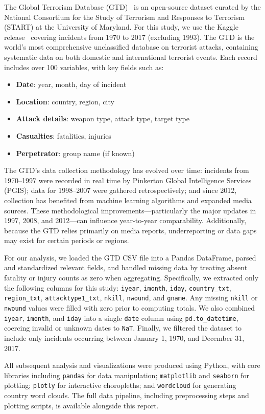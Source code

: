 
The Global Terrorism Database (GTD)~\cite{gtd2018} is an open-source dataset curated by the National Consortium for the Study of Terrorism and Responses to Terrorism (START) at the University of Maryland. For this study, we use the Kaggle release~\cite{kagglegtd} covering incidents from 1970 to 2017 (excluding 1993). The GTD is the world's most comprehensive unclassified database on terrorist attacks, containing systematic data on both domestic and international terrorist events. Each record includes over 100 variables, with key fields such as:
\begin{itemize}
    \item \textbf{Date}: year, month, day of incident
    \item \textbf{Location}: country, region, city
    \item \textbf{Attack details}: weapon type, attack type, target type
    \item \textbf{Casualties}: fatalities, injuries
    \item \textbf{Perpetrator}: group name (if known)
\end{itemize}

The GTD's data collection methodology has evolved over time: incidents from 1970--1997 were recorded in real time by Pinkerton Global Intelligence Services (PGIS); data for 1998--2007 were gathered retrospectively; and since 2012, collection has benefited from machine learning algorithms and expanded media sources. These methodological improvements—particularly the major updates in 1997, 2008, and 2012—can influence year-to-year comparability. Additionally, because the GTD relies primarily on media reports, underreporting or data gaps may exist for certain periods or regions.

For our analysis, we loaded the GTD CSV file into a Pandas DataFrame, parsed and standardized relevant fields, and handled missing data by treating absent fatality or injury counts as zero when aggregating. Specifically, we extracted only the following columns for this study: \texttt{iyear}, \texttt{imonth}, \texttt{iday}, \texttt{country\_txt}, \texttt{region\_txt}, \texttt{attacktype1\_txt}, \texttt{nkill}, \texttt{nwound}, and \texttt{gname}. Any missing \texttt{nkill} or \texttt{nwound} values were filled with zero prior to computing totals. We also combined \texttt{iyear}, \texttt{imonth}, and \texttt{iday} into a single \texttt{date} column using \texttt{pd.to\_datetime}, coercing invalid or unknown dates to \texttt{NaT}. Finally, we filtered the dataset to include only incidents occurring between January 1, 1970, and December 31, 2017.

All subsequent analysis and visualizations were produced using Python, with core libraries including \texttt{pandas} for data manipulation; \texttt{matplotlib} and \texttt{seaborn} for plotting; \texttt{plotly} for interactive choropleths; and \texttt{wordcloud} for generating country word clouds. The full data pipeline, including preprocessing steps and plotting scripts, is available alongside this report.
